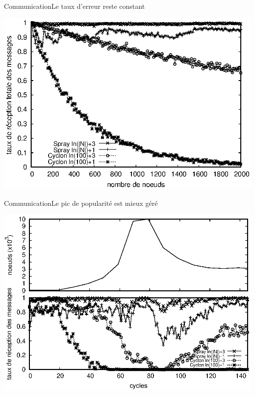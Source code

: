 \begin{frame}{Communication}{Le taux d'erreur reste constant}
  \begin{center}
    \includegraphics[width=1\textwidth]{img/network/hardrate.eps}
  \end{center} 
\end{frame}

\begin{frame}{Communication}{Le pic de popularité est mieux géré}
  \begin{center}
    \includegraphics[width=1\textwidth]{img/network/peak.eps}
  \end{center} 
\end{frame}



